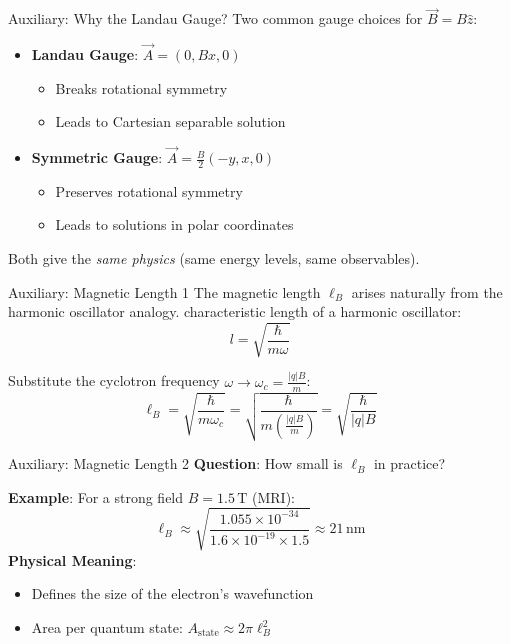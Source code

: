 \documentclass[aspectratio=169, 14pt, t]{beamer}
\begin{document}
\begin{frame}{Auxiliary: Why the Landau Gauge?}
    Two common gauge choices for $\vec{B} = B\hat{z}$:
    \vspace{0.3cm}
    \begin{itemize}
        \item \textbf{Landau Gauge}: $\vec{A} = (0, Bx, 0)$
        \begin{itemize}
            \item Breaks rotational symmetry
            \item Leads to Cartesian separable solution
        \end{itemize}
        \item \textbf{Symmetric Gauge}: $\vec{A} = \frac{B}{2}(-y, x, 0)$
        \begin{itemize}
            \item Preserves rotational symmetry
            \item Leads to solutions in polar coordinates
        \end{itemize}
    \end{itemize}
    \vspace{0.5cm}
    Both give the \textit{same physics} (same energy levels, same observables).
\end{frame}

\begin{frame}{Auxiliary: Magnetic Length 1}
    The magnetic length $\ell_B$ arises naturally from the harmonic oscillator analogy.
    \vspace{0.3cm}
    characteristic length of a harmonic oscillator:
    \[ l = \sqrt{\frac{\hbar}{m\omega}} \]
    
    Substitute the cyclotron frequency $\omega \to \omega_c = \frac{|q|B}{m}$:
    \[
        \ell_B = \sqrt{\frac{\hbar}{m\omega_c}} = \sqrt{\frac{\hbar}{m\left(\frac{|q|B}{m}\right)}} = \sqrt{\frac{\hbar}{|q|B}}
    \]
\end{frame}

\begin{frame}{Auxiliary: Magnetic Length 2}
    \textbf{Question}: How small is $\ell_B$ in practice?
    \vspace{0.3cm}

    \textbf{Example}: For a strong field $B = 1.5\,\text{T}$ (MRI):
    \[
        \ell_B \approx \sqrt{\frac{1.055 \times 10^{-34}}{1.6 \times 10^{-19} \times 1.5}} \approx 21\,\text{nm}
    \]
    \vspace{0.3cm}
    \textbf{Physical Meaning}:
    \begin{itemize}
        \item Defines the size of the electron's wavefunction
        \item Area per quantum state: $A_{\text{state}} \approx 2\pi\ell_B^2$
    \end{itemize}
\end{frame}
\end{document}
